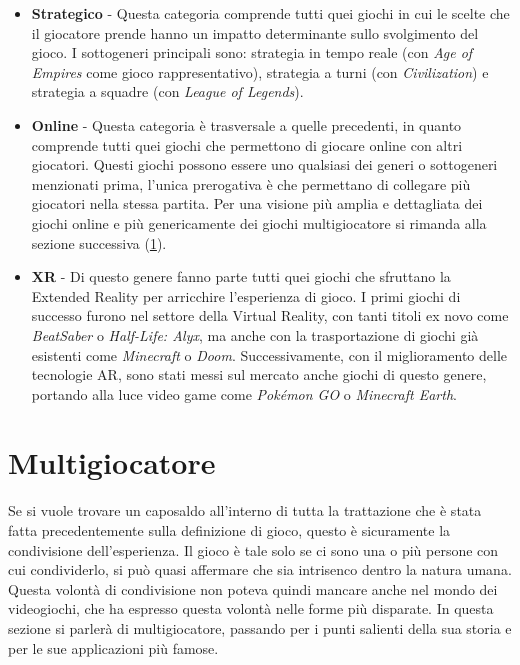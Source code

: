 \begin{itemize}
{                all'interno della stessa sessione un elevato numero di partecipanti, nell'ordine delle centinaia.} (con \textit{World of Warcraft}) e \textit{roguelike} (con \textit{The
                Binding of Isaac}).
            \item \textbf{Strategico} - Questa categoria comprende tutti quei giochi in cui le scelte che il giocatore prende hanno un impatto determinante sullo svolgimento del gioco.
                I sottogeneri principali sono: strategia in tempo reale (con \textit{Age of Empires} come gioco rappresentativo), strategia a turni (con \textit{Civilization}) e 
                strategia a squadre (con \textit{League of Legends}).
            \item \textbf{Online} - Questa categoria è trasversale a quelle precedenti, in quanto comprende tutti quei giochi che permettono di giocare online con altri giocatori. 
                Questi giochi possono essere uno qualsiasi dei generi o sottogeneri menzionati prima, l'unica prerogativa è che permettano di collegare più giocatori nella stessa partita.
                Per una visione più amplia e dettagliata dei giochi online e più genericamente dei giochi multigiocatore si rimanda alla sezione successiva (\ref{sec:Multigiocatore}).
            \item \textbf{XR} - Di questo genere fanno parte tutti quei giochi che sfruttano la Extended Reality per arricchire l'esperienza di gioco. I primi giochi di successo
                furono nel settore della Virtual Reality, con tanti titoli ex novo come \textit{BeatSaber} o \textit{Half-Life: Alyx}, ma anche con la trasportazione di giochi già 
                esistenti come \textit{Minecraft} o \textit{Doom}. Successivamente, con il miglioramento delle tecnologie AR, sono stati messi sul mercato anche giochi di questo genere,
                portando alla luce video game come \textit{Pokémon GO} o \textit{Minecraft Earth}.
        \end{itemize}

\section{Multigiocatore}\label{sec:Multigiocatore}
    Se si vuole trovare un caposaldo all'interno di tutta la trattazione che è stata fatta precedentemente sulla definizione di gioco, questo è sicuramente la condivisione dell'esperienza. 
    Il gioco è tale solo se ci sono una o più persone con cui condividerlo, si può quasi affermare che sia intrisenco dentro la natura umana. Questa volontà di condivisione 
    non poteva quindi mancare anche nel mondo dei videogiochi, che ha espresso questa volontà nelle forme più disparate. In questa sezione si parlerà di multigiocatore, passando per 
    i punti salienti della sua storia e per le sue applicazioni più famose.
